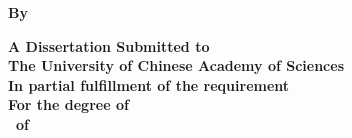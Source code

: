 \newpage
\thispagestyle{empty}

\vspace{1cm}

\begin{center}
    \songti\sanhao\bfseries \uline{\ioatitlee}          
\end{center}
\vspace{2cm}
\begin{center}
    \textbf{\sanhao By\\\xiaosan \ioaauthornamee}
\end{center}
\vspace{2cm}
\begin{center}
    \sanhao\bfseries A Dissertation Submitted to\\
    The University of Chinese Academy of Sciences\\
    In partial fulfillment of the requirement\\
    For the degree of\\
    \ioadegreee~of~\ioamajore

    \vspace{2cm}
    \ioadepartmente

  \makebox{\songti\sihao\textbf{\ioadatee}}
\end{center}


